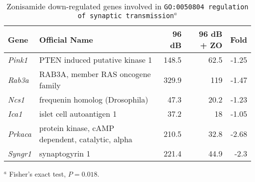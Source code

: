 \documentclass{article}
\begin{document}
\begin{table} 
\caption{Zonisamide down-regulated genes involved in \texttt{GO:0050804~regulation of synaptic transmission}$^a$}
\begin{small}
\begin{tabular}{l p{2.5in }rrr}
  \hline
 Gene& Official Name & 96 dB & 96 dB + ZO & Fold \\ 
  \hline
{\it Pink1 }  &PTEN induced putative kinase 1	&148.5&	62.5&	-1.25 \\
{\it Rab3a }	&RAB3A, member RAS oncogene family&329.9&	119	&-1.47\\
{\it Ncs1 }	&frequenin homolog (Drosophila)	&47.3	&20.2&	-1.23\\
{\it Ica1 }	&islet cell autoantigen 1	&37.2	&18	&-1.05\\
{\it Prkaca }	&protein kinase, cAMP dependent, catalytic, alpha&	210.5&	32.8&	-2.68\\
{\it Syngr1 }	&synaptogyrin 1&	221.4&	44.9&	-2.3\\

\hline
\end{tabular}
$^a$ Fisher's exact test, $P=0.018$.
\end{small}
\label{tab:zosynapse}
\end{table}
\end{document}
